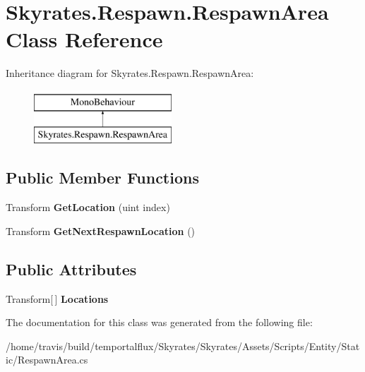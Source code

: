 \hypertarget{class_skyrates_1_1_respawn_1_1_respawn_area}{\section{Skyrates.\-Respawn.\-Respawn\-Area Class Reference}
\label{class_skyrates_1_1_respawn_1_1_respawn_area}
}
Inheritance diagram for Skyrates.\-Respawn.\-Respawn\-Area\-:\begin{figure}[H]
\begin{center}
\leavevmode
\includegraphics[height=2.000000cm]{class_skyrates_1_1_respawn_1_1_respawn_area}
\end{center}
\end{figure}
\subsection*{Public Member Functions}
\begin{DoxyCompactItemize}
\item 
\hypertarget{class_skyrates_1_1_respawn_1_1_respawn_area_aae9a6d89142d7ec6d7457585cc73b8db}{Transform {\bfseries Get\-Location} (uint index)}\label{class_skyrates_1_1_respawn_1_1_respawn_area_aae9a6d89142d7ec6d7457585cc73b8db}

\item 
\hypertarget{class_skyrates_1_1_respawn_1_1_respawn_area_a5160f072ebff3a0fad1edf232127854f}{Transform {\bfseries Get\-Next\-Respawn\-Location} ()}\label{class_skyrates_1_1_respawn_1_1_respawn_area_a5160f072ebff3a0fad1edf232127854f}

\end{DoxyCompactItemize}
\subsection*{Public Attributes}
\begin{DoxyCompactItemize}
\item 
\hypertarget{class_skyrates_1_1_respawn_1_1_respawn_area_aceee944c58c48ed386d6a77514422b60}{Transform\mbox{[}$\,$\mbox{]} {\bfseries Locations}}\label{class_skyrates_1_1_respawn_1_1_respawn_area_aceee944c58c48ed386d6a77514422b60}

\end{DoxyCompactItemize}


The documentation for this class was generated from the following file\-:\begin{DoxyCompactItemize}
\item 
/home/travis/build/temportalflux/\-Skyrates/\-Skyrates/\-Assets/\-Scripts/\-Entity/\-Static/Respawn\-Area.\-cs\end{DoxyCompactItemize}
